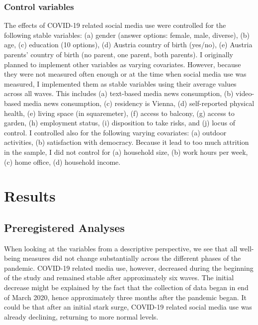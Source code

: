 \documentclass[
  english,
  man,mask,floatsintext]{apa6}
\begin{document}
\hypertarget{control-variables}{%
\subsubsection{Control variables}\label{control-variables}}

The effects of COVID-19 related social media use were controlled for the following stable variables:
(a) gender (answer options: female, male, diverse), (b) age, (c) education (10 options), (d) Austria country of birth (yes/no), (e) Austria parents' country of birth (no parent, one parent, both parents).
I originally planned to implement other variables as varying covariates.
However, because they were not measured often enough or at the time when social media use was measured, I implemented them as stable variables using their average values across all waves.
This includes (a) text-based media news consumption, (b) video-based media news consumption, (c) residency is Vienna, (d) self-reported physical health, (e) living space (in squaremeter), (f) access to balcony, (g) access to garden, (h) employment status, (i) disposition to take risks, and (j) locus of control.
I controlled also for the following varying covariates: (a) outdoor activities, (b) satisfaction with democracy.
Because it lead to too much attrition in the sample, I did not control for (a) household size, (b) work hours per week, (c) home office, (d) household income.

\hypertarget{results}{%
\section{Results}\label{results}}

\hypertarget{preregistered-analyses}{%
\subsection{Preregistered Analyses}\label{preregistered-analyses}}

When looking at the variables from a descriptive perspective, we see that all well-being measures did not change substantially across the different phases of the pandemic.
COVID-19 related media use, however, decreased during the beginning of the study and remained stable after approximately six waves.
The initial decrease might be explained by the fact that the collection of data began in end of March 2020, hence approximately three months after the pandemic began.
It could be that after an initial stark surge, COVID-19 related social media use was already declining, returning to more normal levels.
\end{document}
